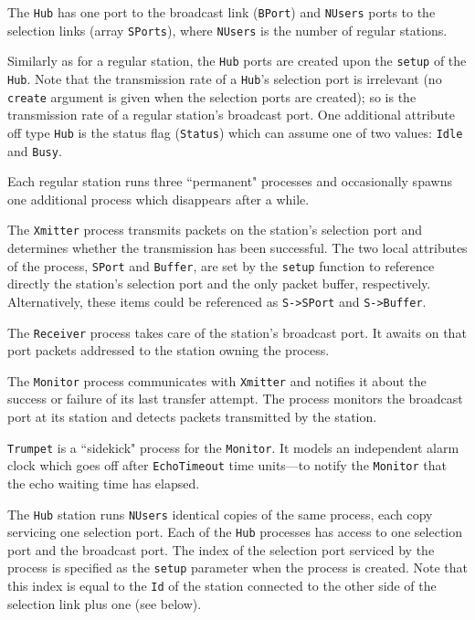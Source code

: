 The {\tt Hub} has one port to the broadcast link ({\tt BPort}) and
{\tt NUsers} ports to the selection links (array {\tt SPorts}),
where {\tt NUsers} is the number of regular stations.

Similarly as for a regular station, the {\tt Hub} ports
are created upon the {\tt setup} of the {\tt Hub}.
Note that the transmission rate of a {\tt Hub}'s selection port is
irrelevant (no {\tt create} argument is given when the selection ports are
created);
so is the transmission rate of a regular station's broadcast port.
One additional attribute off type
{\tt Hub} is the status flag ({\tt Status}) which can
assume one of two values: {\tt Idle} and {\tt Busy}.

Each regular station runs three ``permanent" processes and occasionally
spawns one additional process which disappears after a while.

The {\tt Xmitter} process transmits packets on the station's selection port
and determines whether the transmission has been successful.
The two local attributes of the process, {\tt SPort} and {\tt Buffer}, are set
by the {\tt setup} function to reference directly
the station's selection port and the only packet buffer, respectively.
Alternatively, these items could be referenced as {\tt S->SPort} and
{\tt S->Buffer}.

The {\tt Receiver} process takes care of the station's broadcast port.
It awaits on that port packets addressed to the station owning the process.

The {\tt Monitor} process communicates with {\tt Xmitter} and notifies it
about the success or failure of its last transfer attempt.
The process monitors the broadcast port at its station and detects packets
transmitted by the station.

{\tt Trumpet} is a ``sidekick" process for the {\tt Monitor}.
It models an independent alarm clock which goes off after {\tt EchoTimeout}
time units---to notify the {\tt Monitor} that the echo waiting time has
elapsed.

The {\tt Hub} station runs {\tt NUsers} identical copies of the same process,
each copy servicing one selection port.
Each of the {\tt Hub} processes has access to one selection port
and the broadcast port.
The index of the selection port serviced by the process is specified
as the {\tt setup} parameter when the process is created.
Note that this index is equal to the {\tt Id} of the station connected
to the other side of the selection link plus one (see below).

